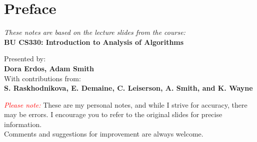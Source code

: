\chapter*{Preface}

\begin{center}
    \vfill
    \textit{These notes are based on the lecture slides from the course:}\\
    \textbf{BU CS330: Introduction to Analysis of Algorithms}
    
    \vspace{1em}
    \small{
    Presented by:\\
    \textbf{Dora Erdos, Adam Smith}\\
    With contributions from:\\
    \textbf{S. Raskhodnikova, E. Demaine, C. Leiserson, A. Smith, and K. Wayne}
    }

    \vspace{3em}
    \textcolor{red}{\textit{Please note:}} These are my personal notes, and while I strive for accuracy, there may be errors. I encourage you to refer to the original slides for precise information.\\
    Comments and suggestions for improvement are always welcome.
    \vfill
\end{center}
